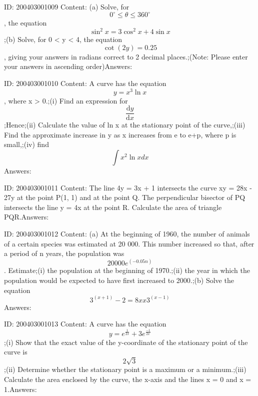 \documentclass{article}
\begin{document}
ID: 200403001009
Content:
(a)	Solve, for $$0^{\circ}\leq\theta\leq360^{\circ}$$, the equation $$\sin ^2x=3\cos ^2x+4\sin x$$;(b)	Solve, for 0 < y < 4, the equation $$\cot (2y)=0.25$$, giving your answers in radians correct to 2 decimal places.;(Note: Please enter your answers in ascending order)Answers:

ID: 200403001010
Content:
A curve has the equation $$y=x^3\ln x$$, where x > 0.;(i)	Find an expression for $$\frac{\mathrm{d} y}{\mathrm{d} x}$$;Hence;(ii) Calculate the value of ln x at the stationary point of the curve,;(iii) Find the approximate increase in y as x increases from e to e+p, where p is small,;(iv) find $$\int x^2\ln x dx$$Answers:

ID: 200403001011
Content:
The line 4y = 3x + 1 intersects the curve xy = 28x - 27y at the point P(1, 1) and at the point Q. The perpendicular bisector of PQ intersects the line y = 4x at the point R. Calculate the area of triangle PQR.Answers:

ID: 200403001012
Content:
(a)	At the beginning of 1960, the number of animals of a certain species was estimated at 20 000. This number increased so that, after a period of n years, the population was \[20000e^{(-0.05n)}\]. Estimate;(i) the population at the beginning of 1970.;(ii) the year in which the population would be expected to have first increased to 2000.;(b) Solve the equation \[3^{(x+1)}-2=8 xx 3^{(x-1)}\]Answers:

ID: 200403001013
Content:
A curve has the equation $$y=e^{\frac{1}{2x}}+3e^{\frac{-1}{2x}}$$;(i)	Show that the exact value of the y-coordinate of the stationary point of the curve is $$2\sqrt3$$;(ii)	Determine whether the stationary point is a maximum or a minimum.;(iii)	Calculate the area enclosed by the curve, the x-axis and the lines x = 0 and x = 1.Answers:
\end{document}
